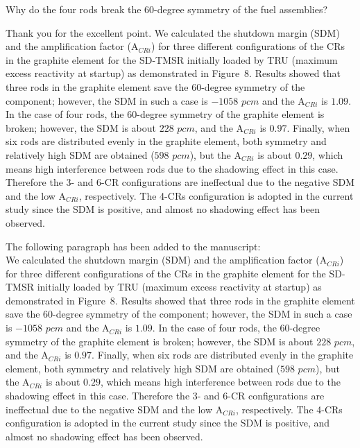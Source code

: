 \documentclass[answers,11pt]{exam}
\begin{document}
\begin{questions}
\begin{solution}
        \end{solution}

        \question Why do the four rods break the 60-degree symmetry of the fuel assemblies?
        
        \begin{solution}
                 Thank you for the excellent point. We calculated the shutdown margin (SDM) and the amplification factor (A$_{CRi}$) for three different configurations of the CRs in the graphite element for the SD-TMSR initially loaded by TRU (maximum excess reactivity at startup) as demonstrated in Figure~8. Results showed that three rods in the graphite element save the 60-degree symmetry of the component; however, the SDM in such a case is $-1058$ $pcm$ and the A$_{CRi}$ is $1.09$. In the case of four rods, the 60-degree symmetry of the graphite element is broken; however, the SDM is about $228$ $pcm$, and the A$_{CRi}$ is $0.97$. Finally, when six rods are distributed evenly in the graphite element, both symmetry and relatively high SDM are obtained ($598$ $pcm$), but the A$_{CRi}$ is about $0.29$, which means high interference between rods due to the shadowing effect in this case. Therefore the 3- and 6-CR configurations are ineffectual due to the negative SDM and the low A$_{CRi}$, respectively. The 4-CRs configuration is adopted in the current study since the SDM is positive, and almost no shadowing effect has been observed.
                 
                 The following paragraph has been added to the manuscript:\\
               
We calculated the shutdown margin (SDM) and the amplification factor (A$_{CRi}$) for three different configurations of the CRs in the graphite element for the SD-TMSR initially loaded by TRU (maximum excess reactivity at startup) as demonstrated in Figure~8. Results showed that three rods in the graphite element save the 60-degree symmetry of the component; however, the SDM in such a case is $-1058$ $pcm$ and the A$_{CRi}$ is $1.09$. In the case of four rods, the 60-degree symmetry of the graphite element is broken; however, the SDM is about $228$ $pcm$, and the A$_{CRi}$ is $0.97$. Finally, when six rods are distributed evenly in the graphite element, both symmetry and relatively high SDM are obtained ($598$ $pcm$), but the A$_{CRi}$ is about $0.29$, which means high interference between rods due to the shadowing effect in this case. Therefore the 3- and 6-CR configurations are ineffectual due to the negative SDM and the low A$_{CRi}$, respectively. The 4-CRs configuration is adopted in the current study since the SDM is positive, and almost no shadowing effect has been observed.



\end{solution}
\end{questions}
\end{document}

